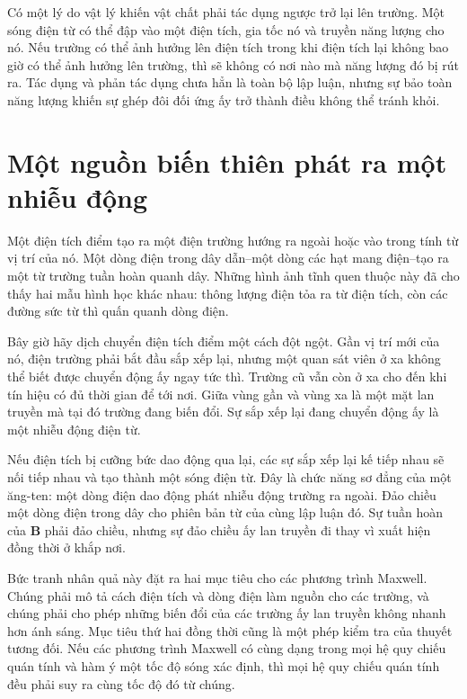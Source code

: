 Có một lý do vật lý khiến vật chất phải tác dụng ngược trở lại lên trường. Một sóng điện từ có thể đập vào một điện tích, gia tốc nó và truyền năng lượng cho nó. Nếu trường có thể ảnh hưởng lên điện tích trong khi điện tích lại không bao giờ có thể ảnh hưởng lên trường, thì sẽ không có nơi nào mà năng lượng đó bị rút ra. Tác dụng và phản tác dụng chưa hẳn là toàn bộ lập luận, nhưng sự bảo toàn năng lượng khiến sự ghép đôi đối ứng ấy trở thành điều không thể tránh khỏi.

\section{Một nguồn biến thiên phát ra một nhiễu động}

Một điện tích điểm tạo ra một điện trường hướng ra ngoài hoặc vào trong tính từ vị trí của nó. Một dòng điện trong dây dẫn--một dòng các hạt mang điện--tạo ra một từ trường tuần hoàn quanh dây. Những hình ảnh tĩnh quen thuộc này đã cho thấy hai mẫu hình học khác nhau: thông lượng điện tỏa ra từ điện tích, còn các đường sức từ thì quấn quanh dòng điện.

Bây giờ hãy dịch chuyển điện tích điểm một cách đột ngột. Gần vị trí mới của nó, điện trường phải bắt đầu sắp xếp lại, nhưng một quan sát viên ở xa không thể biết được chuyển động ấy ngay tức thì. Trường cũ vẫn còn ở xa cho đến khi tín hiệu có đủ thời gian để tới nơi. Giữa vùng gần và vùng xa là một mặt lan truyền mà tại đó trường đang biến đổi. Sự sắp xếp lại đang chuyển động ấy là một nhiễu động điện từ.

Nếu điện tích bị cưỡng bức dao động qua lại, các sự sắp xếp lại kế tiếp nhau sẽ nối tiếp nhau và tạo thành một sóng điện từ. Đây là chức năng sơ đẳng của một ăng-ten: một dòng điện dao động phát nhiễu động trường ra ngoài. Đảo chiều một dòng điện trong dây cho phiên bản từ của cùng lập luận đó. Sự tuần hoàn của \(\mathbf B\) phải đảo chiều, nhưng sự đảo chiều ấy lan truyền đi thay vì xuất hiện đồng thời ở khắp nơi.

Bức tranh nhân quả này đặt ra hai mục tiêu cho các phương trình Maxwell. Chúng phải mô tả cách điện tích và dòng điện làm nguồn cho các trường, và chúng phải cho phép những biến đổi của các trường ấy lan truyền không nhanh hơn ánh sáng. Mục tiêu thứ hai đồng thời cũng là một phép kiểm tra của thuyết tương đối. Nếu các phương trình Maxwell có cùng dạng trong mọi hệ quy chiếu quán tính và hàm ý một tốc độ sóng xác định, thì mọi hệ quy chiếu quán tính đều phải suy ra cùng tốc độ đó từ chúng.

